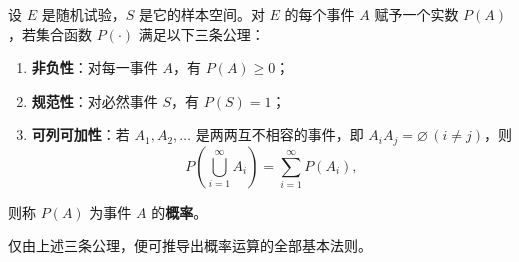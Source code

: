 \begin{definition}[概率的公理化定义]
\label{def:probability-axioms}
设 $E$ 是随机试验，$S$ 是它的样本空间。对 $E$ 的每个事件 $A$ 赋予一个实数 $P(A)$，若集合函数 $P(\cdot)$ 满足以下三条公理：
\begin{enumerate}
  \item \textbf{非负性}：对每一事件 $A$，有 $P(A)\ge 0$；
  \item \textbf{规范性}：对必然事件 $S$，有 $P(S)=1$；
  \item \textbf{可列可加性}：若 $A_1,A_2,\ldots$ 是两两互不相容的事件，即 $A_iA_j=\varnothing\,(i\ne j)$，则
  \begin{equation}
    P\left(\bigcup_{i=1}^{\infty}A_i\right)=\sum_{i=1}^{\infty}P(A_i),
    \label{eq:countable-additivity}
  \end{equation}
\end{enumerate}
则称 $P(A)$ 为事件 $A$ 的\textbf{概率}。
\end{definition}

仅由上述三条公理，便可推导出概率运算的全部基本法则。

